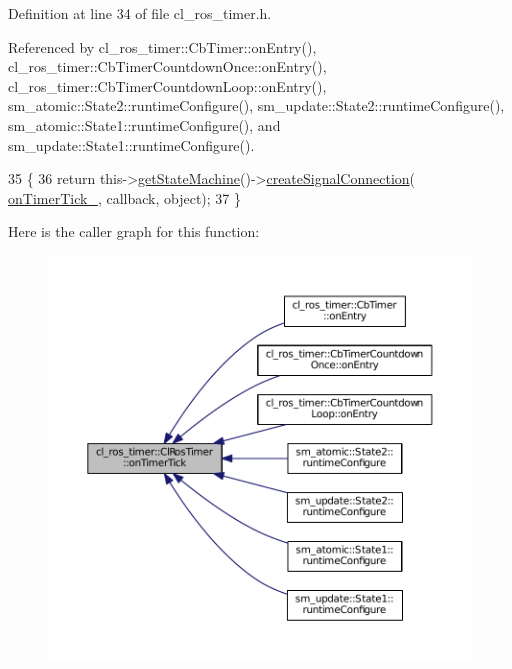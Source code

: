 Definition at line 34 of file cl\+\_\+ros\+\_\+timer.\+h.



Referenced by cl\+\_\+ros\+\_\+timer\+::\+Cb\+Timer\+::on\+Entry(), cl\+\_\+ros\+\_\+timer\+::\+Cb\+Timer\+Countdown\+Once\+::on\+Entry(), cl\+\_\+ros\+\_\+timer\+::\+Cb\+Timer\+Countdown\+Loop\+::on\+Entry(), sm\+\_\+atomic\+::\+State2\+::runtime\+Configure(), sm\+\_\+update\+::\+State2\+::runtime\+Configure(), sm\+\_\+atomic\+::\+State1\+::runtime\+Configure(), and sm\+\_\+update\+::\+State1\+::runtime\+Configure().


\begin{DoxyCode}
35     \{
36         \textcolor{keywordflow}{return} this->\hyperlink{classsmacc_1_1ISmaccClient_aec51d4712404cb9882b86e4c854bb93a}{getStateMachine}()->\hyperlink{classsmacc_1_1ISmaccStateMachine_adf0f42ade0c65cc471960fe2a7c42da2}{createSignalConnection}(
      \hyperlink{classcl__ros__timer_1_1ClRosTimer_a2fcaab287b6ee13f6cc689876c6d28fa}{onTimerTick\_}, callback, \textcolor{keywordtype}{object});
37     \}
\end{DoxyCode}


Here is the caller graph for this function\+:
\nopagebreak
\begin{figure}[H]
\begin{center}
\leavevmode
\includegraphics[width=350pt]{classcl__ros__timer_1_1ClRosTimer_a7edcc057bfb5a25fe0892755137dd8da_icgraph}
\end{center}
\end{figure}



